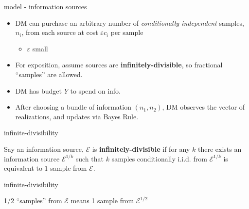\documentclass[square,]{gBakerBeamer}
\renewcommand{\|}{\,|\,}
\newcommand{\E}{\mathcal{E}}
\begin{document}
\begin{frame}[label=info-sources]{model - information sources}

  \begin{itemize}
    \item DM can purchase an arbitrary number of
          \textit{conditionally independent} samples, $n_i$, from each source at cost $\varepsilon c_i$ per sample
          \begin{itemize}
            \item $\varepsilon$ small\bigskip
          \end{itemize}
    \item For exposition, assume sources are \textbf{infinitely-divisible}, so fractional ``samples'' are allowed.\bigskip\pause
    \item DM has budget $Y$ to spend on info.\bigskip\pause

    \item \alert{After choosing a bundle of information $(n_1, n_2)$, DM observes the vector of realizations, and updates via Bayes Rule.}
  \end{itemize}

  \note{%

  }
\end{frame}


\begin{frame}{infinite-divisibility}

  \begin{definition}
    Say an information source, $\mathcal{E}$ is \textbf{infinitely-divisible} if for any $k$ there exists an information source $\mathcal{E}^{1/k}$ such that $k$ samples conditionally i.i.d. from $\mathcal{E}^{1/k}$ is equivalent to $1$ sample from $\mathcal{E}$.
  \end{definition}

  \note{%

  }
\end{frame}


\begin{frame}{infinite-divisibility}

  1/2 ``samples'' from $\E$ means 1 sample from $\E^{1/2}$
  \centering

  \note{%

  }
\end{frame}
\end{document}
